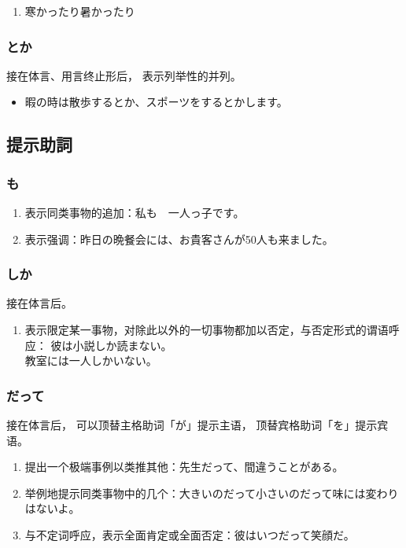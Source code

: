 \begin{enumerate}
  \item 寒かったり暑かったり
\end{enumerate}


\subsubsection{とか}%

接在体言、用言终止形后，
表示列举性的并列。
\begin{itemize}
  \item 暇の時は散歩するとか、スポーツをするとかします。
\end{itemize}


\subsection{提示助詞}%

\subsubsection{も}%

\begin{enumerate}
  \item 表示同类事物的追加：私も　一人っ子です。
  \item 表示强调：昨日の晩餐会には、お貴客さんが50人も来ました。
\end{enumerate}


\subsubsection{しか}%

接在体言后。
\begin{enumerate}
  \item 表示限定某一事物，对除此以外的一切事物都加以否定，与否定形式的谓语呼应：
    彼は小説しか読まない。\\
    教室には一人しかいない。
\end{enumerate}

\subsubsection{だって}%

接在体言后，
可以顶替主格助词「が」提示主语，
顶替宾格助词「を」提示宾语。
\begin{enumerate}
  \item 提出一个极端事例以类推其他：先生だって、間違うことがある。
  \item 举例地提示同类事物中的几个：大きいのだって小さいのだって味には変わりはないよ。
  \item 与不定词呼应，表示全面肯定或全面否定：彼はいつだって笑顔だ。
\end{enumerate}

